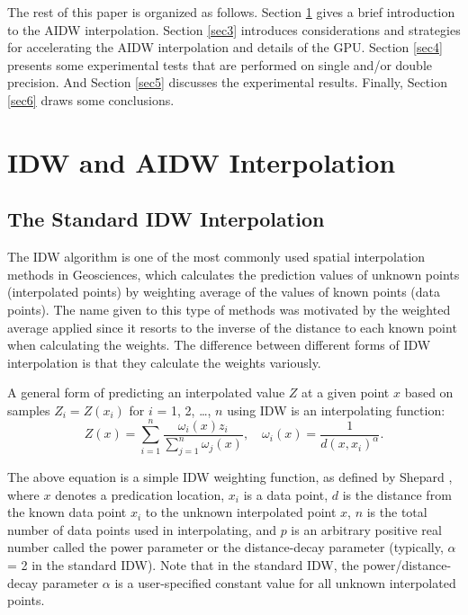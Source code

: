 \documentclass[fleqn,11pt]{wlscirep}
\begin{document}
The rest of this paper is organized as follows. Section \ref{sec2} gives a brief 
introduction to the AIDW interpolation. Section \ref{sec3} introduces considerations 
and strategies for accelerating the AIDW interpolation and details of the 
GPU. Section \ref{sec4} presents some experimental tests that are performed on single 
and/or double precision. And Section \ref{sec5} discusses the experimental results. 
Finally, Section \ref{sec6} draws some conclusions.

\section{IDW and AIDW Interpolation }\label{sec2}
\subsection{The Standard IDW Interpolation}
The IDW algorithm is one of the most commonly used spatial interpolation 
methods in Geosciences, which calculates the prediction values of unknown 
points (interpolated points) by weighting average of the values of known 
points (data points). The name given to this type of methods was motivated 
by the weighted average applied since it resorts to the inverse of the 
distance to each known point when calculating the weights. The difference 
between different forms of IDW interpolation is that they calculate the 
weights variously. 

A general form of predicting an interpolated value $Z$ at a given point $x$ based 
on samples $Z_{i}=Z(x_{i})$ for $i$ = 1, 2, {\ldots}, $n$ using IDW is an 
interpolating function: 
\begin{equation}
\label{eq1}
Z(x)={\sum\limits_{i=1}^n }{\frac{\omega _i (x)z_i }{\sum\limits_{j=1}^n 
		{\omega _j (x)} }} ,
\quad
\omega _i (x)=\frac{1}{d(x,x_i )^\alpha }.
\end{equation}

The above equation is a simple IDW weighting function, as defined by Shepard \cite{01}, where $x$ denotes a predication location, $x_{i }$ is a data 
point, $d$ is the distance from the known data point $x_{i}$ to the unknown 
interpolated point $x$, $n$ is the total number of data points used in 
interpolating, and $p$ is an arbitrary positive real number called the power 
parameter or the distance-decay parameter (typically, $\alpha $ = 2 in the 
standard IDW). Note that in the standard IDW, the power/distance-decay 
parameter $\alpha $ is a user-specified constant value for all unknown 
interpolated points. 
\end{document}
